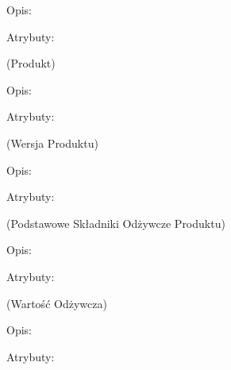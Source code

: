 \begin{enumerate}[label={\textbf{KAT/\protect\threedigits{\theenumi}}}, wide, labelwidth=!, labelindent=0pt, labelsep=0pt, series=reqs]
    Opis: \lipsum[1]
    \par
    Atrybuty:
    \begin{itemize}[series=atr]
         \label{kat:PricingTranslation:id}
         \label{kat:PricingTranslation:title}
         \label{kat:PricingTranslation:description}
         \label{kat:PricingTranslation:language}
    \end{itemize}

     \label{kat:Product} (Produkt)

    Opis: \lipsum[1]
    \par
    Atrybuty:
    \begin{itemize}[series=atr]
         \label{kat:Product:id}
         \label{kat:Product:source}
         \label{kat:Product:isPublic}
         \label{kat:Product:language}
    \end{itemize}

     \label{kat:ProductVersion} (Wersja Produktu)

    Opis: \lipsum[1]
    \par
    Atrybuty:
    \begin{itemize}[series=atr]
         \label{kat:ProductVersion:id}
         \label{kat:ProductVersion:editTimestamp}
         \label{kat:ProductVersion:description}
    \end{itemize}

     \label{kat:ProductBasicNutritionData} (Podstawowe Składniki Odżywcze Produktu)

    Opis: \lipsum[1]
    \par
    Atrybuty:
    \begin{itemize}[series=atr]
         \label{kat:ProductBasicNutritionData:id}
         \label{kat:ProductBasicNutritionData:energy}
         \label{kat:ProductBasicNutritionData:protein}
         \label{kat:ProductBasicNutritionData:fat}
         \label{kat:ProductBasicNutritionData:carbohydrates}
    \end{itemize}

     \label{kat:NutritionData} (Wartość Odżywcza)

    Opis: \lipsum[1]
    \par
    Atrybuty:
    \begin{itemize}[series=atr]
         \label{kat:NutritionData:id}
         \label{kat:NutritionData:nutritionValue}
    \end{itemize}


\end{enumerate}
